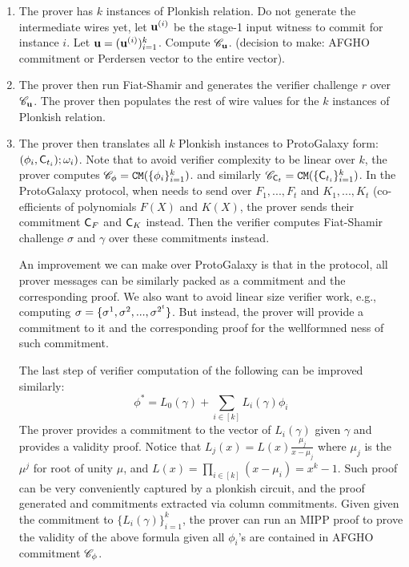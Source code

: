 \begin{enumerate}
  \item The prover has $k$ instances of Plonkish relation. Do not
  generate the intermediate wires yet, let ${{\mathbf {u}}}^{(i)}$ be the
  stage-1 input witness to commit for instance $i$. 
  Let ${{\mathbf {u}}} = ({{\mathbf {u}}}^{(i)})_{i=1}^k$. Compute
  ${\mathscr{C}}_{{{\mathbf {u}}}}$. (decision to make: AFGHO commitment
  or Perdersen vector to the entire vector).

  \item The prover then run Fiat-Shamir and generates
  the verifier challenge $r$ over ${\mathscr{C}}_{{{\mathbf {u}}}}$.
  The prover then populates the rest of wire values for
  the $k$ instances of Plonkish relation.
  
  \item The prover then translates all $k$ Plonkish instances
  to ProtoGalaxy form: $(\phi_i, {\mathsf{C}}_{t_i}); \omega_i)$.
  Note that to avoid verifier complexity to be linear over $k$,
  the prover computes ${\mathscr{C}}_\phi = {\mathtt{CM}}(\{\phi_i\}_{i=1}^k)$.
  and similarly ${\mathscr{C}}_{{\mathsf{C}}_{t}} = {\mathtt{CM}}(\{{\mathsf{C}}_{t_i}\}_{i=1}^k)$.
  In the ProtoGalaxy protocol, when needs to send over
  $F_1, ..., F_t$ and $K_1, ..., K_t$ (co-efficients of polynomials
  $F(X)$ and $K(X)$, the prover sends their commitment
  ${\mathsf{C}}_F$ and ${\mathsf{C}}_K$ instead. Then the verifier computes
  Fiat-Shamir challenge $\sigma$ and $\gamma$ over these commitments
  instead.

  	An improvement we can make over ProtoGalaxy is that
	in the protocol, all prover messages can be similarly packed
	as a commitment and the corresponding proof. We also want to
	avoid linear size verifier work, e.g., computing
	${{\mathbf {\sigma}}} = \{\sigma^1, \sigma^2, ..., \sigma^{2^t}\}$.
	But instead, the prover will provide a commitment to it and
	the corresponding proof for the wellformned ness of such commitment.

	The last step of verifier computation of the following can
	be improved similarly:
	\[
		\phi^* = L_0(\gamma) + \sum_{i\in [k]} L_i(\gamma) \phi_i
	\]
	The prover provides a commitment to the vector of $L_i(\gamma)$
	given $\gamma$ and provides a validity proof. Notice that
	$L_j(x) = L(x) \frac{\mu_j}{x-\mu_j}$ where $\mu_j$ is the
	$\mu^j$ for root of unity $\mu$, and $L(x) = \prod_{i\in[k]} (x-\mu_i)
	 = x^k -1$. Such proof can be very conveniently captured by
	 a plonkish circuit, and the proof generated and commitments
	 extracted via column commitments. Given given
	 the commitment to $\{L_i(\gamma)\}_{i=1}^k$, the prover 
	 can run an MIPP proof to prove the validity of the above formula
	 given all $\phi_i$'s are contained in AFGHO commitment 
	 ${\mathscr{C}}_{\phi}$.


\end{enumerate}
